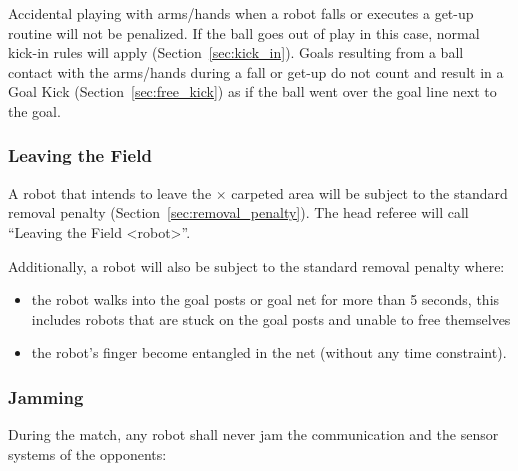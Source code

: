 Accidental playing with arms/hands when a robot falls or executes a get-up routine will not be penalized. 
If the ball goes out of play in this case, normal kick-in rules will apply (\cf Section~\ref{sec:kick_in}). 
Goals resulting from a ball contact with the arms/hands during a fall or get-up do not count and result in a Goal Kick (\cf Section~\ref{sec:free_kick}) as if the ball went over the goal line next to the goal.

\subsubsection{Leaving the Field}
\label{sec:leaving_field}

A robot that intends to leave the \TotalWidth $\times$ \TotalLength carpeted area will be subject to the standard removal penalty (\cf Section~\ref{sec:removal_penalty}).
The head referee will call ``Leaving the Field \textless robot\textgreater''.

Additionally, a robot will also be subject to the standard removal penalty where:
\begin{itemize}
\item the robot walks into the goal posts or goal net for more than 5 seconds, this includes robots that are stuck on the goal posts and unable to free themselves
\item the robot's finger become entangled in the net (without any time constraint).
\end{itemize}

\subsubsection{Jamming}
\label{sec:jamming}
During the match, any robot shall never jam the communication and the sensor systems of the opponents:


